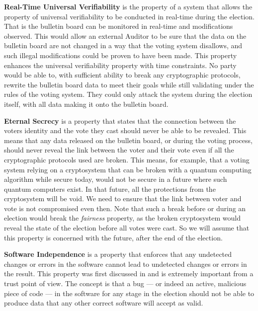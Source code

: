 \textbf{Real-Time Universal Verifiability} is the property of a system that allows the property of universal verifiability to be conducted in real-time during the election. That is the bulletin board can be monitored in real-time and modifications observed. This would allow an external Auditor to be sure that the data on the bulletin board are not changed in a way that the voting system disallows, and such illegal modifications could be proven to have been made. This property enhances the universal verifiability property with time constraints. No party would be able to, with sufficient ability to break any cryptographic protocols, rewrite the bulletin board data to meet their goals while still validating under the rules of the voting system. They could only attack the system during the election itself, with all data making it onto the bulletin board.

\textbf{Eternal Secrecy} is a property that states that the connection between the voters identity and the vote they cast should never be able to be revealed. This means that any data released on the bulletin board, or during the voting process, should never reveal the link between the voter and their vote even if all the cryptographic protocols used are broken. This means, for example, that a voting system relying on a cryptosystem that can be broken with a quantum computing algorithm while secure today, would not be secure in a future where such quantum computers exist. In that future, all the protections from the cryptosystem will be void. We need to ensure that the link between voter and vote is not compromised even then. Note that such a break before or during an election would break the \emph{fairness} property, as the broken cryptosystem would reveal the state of the election before all votes were cast. So we will assume that this property is concerned with the future, after the end of the election.


\textbf{Software Independence} is a property that enforces that any undetected changes or errors in the software cannot lead to undetected changes or errors in the result. This property was first discussed in \cite{rivestNoitionSoftwareIndependence2008} and is extremely important from a trust point of view. The concept is that a bug --- or indeed an active, malicious piece of code --- in the software for any stage in the election should not be able to produce data that any other correct software will accept as valid.


